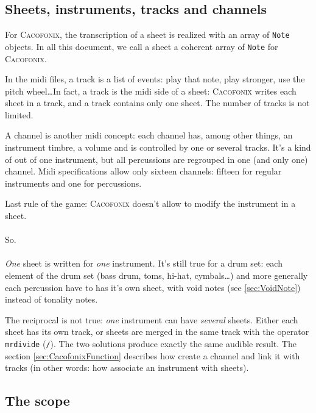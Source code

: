 \documentclass{article}
\newcommand{\cacofonix}{\textsc{Cacofonix}\xspace}
\newcommand{\note}{\lstinline!Note!\xspace}
\begin{document}
\subsection{Sheets, instruments, tracks and channels}

For \cacofonix, the transcription of a sheet is realized with an array of \note objects. In all this document, we call a sheet a coherent array of \note for \cacofonix.

In the midi files, a track is a list of events: play that note, play stronger, use the pitch wheel\dots In fact, a track is the midi side of a sheet: \cacofonix writes each sheet in a track, and a track contains only one sheet. The number of tracks is not limited.

A channel is another midi concept: each channel has, among other things, an instrument timbre, a volume and is controlled by one or several tracks. It's a kind of out of one instrument, but all percussions are regrouped in one (and only one) channel. Midi specifications allow only sixteen channels: fifteen for regular instruments and one for percussions.

Last rule of the game: \cacofonix doesn't allow to modify the instrument in a sheet.

\paragraph{}

So.

\paragraph{}

\emph{One} sheet is written for \emph{one} instrument. It's still true for a drum set: each element of the drum set (bass drum, toms, hi-hat, cymbals\dots) and more generally each percussion have to has it's own sheet, with void notes (see \ref{sec:VoidNote}) instead of tonality notes.

The reciprocal is not true: \emph{one} instrument can have \emph{several} sheets. Either each sheet has its own track, or sheets are merged in the same track with the operator \lstinline!mrdivide! (\lstinline!/!). The two solutions produce exactly the same audible result. The section \ref{sec:CacofonixFunction} describes how create a channel and link it with tracks (in other words: how associate an instrument with sheets).

\subsection{The scope}
\label{sec:scope}
\end{document}
